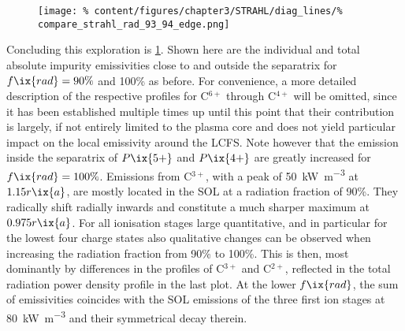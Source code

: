 %
        \begin{figure}[t]%
            \centering%
                \texttt{[image: \%
                    content/figures/chapter3/STRAHL/diag\_lines/\%
                    compare\_strahl\_rad\_93\_94\_edge.png]}%
            \label{fig:total_rad_93_94_edge}%
        \end{figure}%
%
        Concluding this exploration is \cref{fig:total_rad_93_94_edge}. Shown here are the individual and total absolute impurity emissivities close to and outside the separatrix for $f\ix{rad}=90\%$ and 100\% as before. For convenience, a more detailed description of the respective profiles for C$^{6+}$ through C$^{4+}$ will be omitted, since it has been established multiple times up until this point that their contribution is largely, if not entirely limited to the plasma core and does not yield particular impact on the local emissivity around the LCFS. Note however that the emission inside the separatrix of $P\ix{5+}$ and $P\ix{4+}$ are greatly increased for $f\ix{rad}=100\%$. Emissions from C$^{3+}$, with a peak of \SI{50}{\kilo\watt\per\cubic\meter} at $1.15r\ix{a}$, are mostly located in the SOL at a radiation fraction of 90\%. They radically shift radially inwards and constitute a much sharper maximum at $0.975r\ix{a}$. For all ionisation stages large quantitative, and in particular for the lowest four charge states also qualitative changes can be observed when increasing the radiation fraction from 90\% to 100\%. This is then, most dominantly by differences in the profiles of C$^{3+}$ and C$^{2+}$, reflected in the total radiation power density profile in the last plot. At the lower $f\ix{rad}$, the sum of emissivities coincides with the SOL emissions of the three first ion stages at \SI{80}{\kilo\watt\per\cubic\meter} and their symmetrical decay therein.\\%
%
        \newline%
